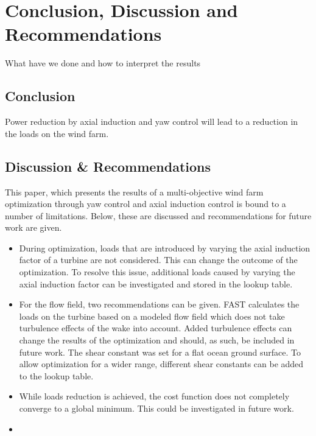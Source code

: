 \section{Conclusion, Discussion and Recommendations}
What have we done and how to interpret the results
\subsection{Conclusion}
Power reduction by axial  induction and yaw control will lead to a reduction in the loads on the wind farm. 
 

\subsection{Discussion \& Recommendations}
This paper, which presents the results of a multi-objective wind farm optimization through yaw control and axial induction control is bound to a number of limitations. Below, these are discussed and recommendations for future work are given.
\begin{itemize}
	\item During optimization, loads that are introduced by varying the axial induction factor of a turbine are not considered. This can change the outcome of the optimization. To resolve this issue, additional loads caused by varying the axial induction factor can be investigated and stored in the lookup table.
	\item For the flow field, two recommendations can be given. FAST calculates the loads on the turbine based on a modeled flow field which does not take turbulence effects of the wake into account. Added turbulence effects can change the results of the optimization and should, as such, be included in future work. The shear constant was set for a flat ocean ground surface. To allow optimization for a wider range, different shear constants can be added to the lookup table.
	\item While loads reduction is achieved, the cost function does not completely converge to a global minimum. This could be investigated in future work.
	\item 
\end{itemize}

  
